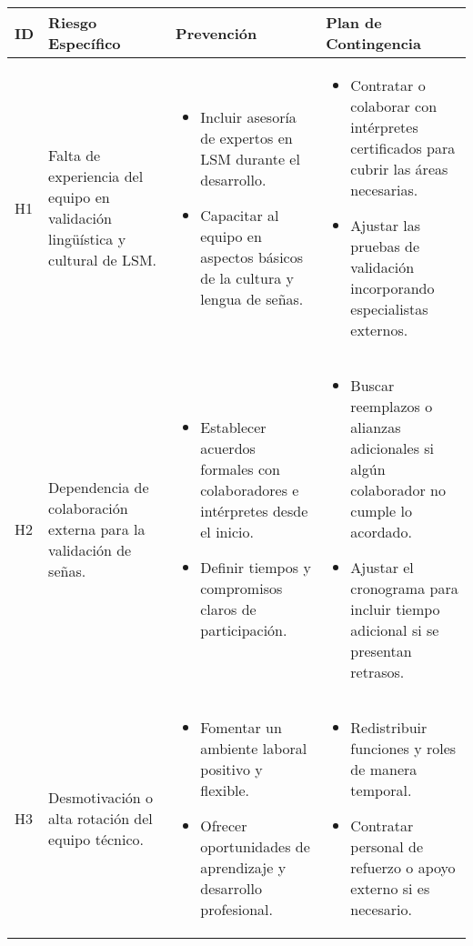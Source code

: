 \begin{longtable}{|>{\centering\arraybackslash}p{0.7cm}|>{\raggedright\arraybackslash}p{4cm}|>{\raggedright\arraybackslash}p{5.5cm}|>{\raggedright\arraybackslash}p{5.5cm}|}
	\hline
	\textbf{ID} & \textbf{Riesgo Específico} & \textbf{Prevención} & \textbf{Plan de Contingencia} \\
	\hline
	H1 & Falta de experiencia del equipo en validación lingüística y cultural de LSM. &
	\begin{itemize}
		\item Incluir asesoría de expertos en LSM durante el desarrollo.
		\item Capacitar al equipo en aspectos básicos de la cultura y lengua de señas.
	\end{itemize} &
	\begin{itemize}
		\item Contratar o colaborar con intérpretes certificados para cubrir las áreas necesarias.
		\item Ajustar las pruebas de validación incorporando especialistas externos.
	\end{itemize} \\
	\hline
	H2 & Dependencia de colaboración externa para la validación de señas. &
	\begin{itemize}
		\item Establecer acuerdos formales con colaboradores e intérpretes desde el inicio.
		\item Definir tiempos y compromisos claros de participación.
	\end{itemize} &
	\begin{itemize}
		\item Buscar reemplazos o alianzas adicionales si algún colaborador no cumple lo acordado.
		\item Ajustar el cronograma para incluir tiempo adicional si se presentan retrasos.
	\end{itemize} \\
	\hline
	H3 & Desmotivación o alta rotación del equipo técnico. &
	\begin{itemize}
		\item Fomentar un ambiente laboral positivo y flexible.
		\item Ofrecer oportunidades de aprendizaje y desarrollo profesional.
	\end{itemize} &
	\begin{itemize}
		\item Redistribuir funciones y roles de manera temporal.
		\item Contratar personal de refuerzo o apoyo externo si es necesario.

\end{itemize}
\end{longtable}
